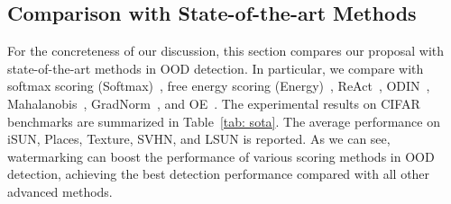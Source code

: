 \documentclass{article}
\begin{document}
\subsection{Comparison with State-of-the-art Methods}

For the concreteness of our discussion, this section compares our proposal with state-of-the-art methods in OOD detection. In particular, we compare with softmax scoring (Softmax)~\cite{hendrycks2016baseline}, free energy scoring (Energy)~\cite{liu2020energy}, ReAct~\cite{sun2021react}, ODIN~\cite{LiangLS18}, Mahalanobis~\cite{lee2018simple}, GradNorm~\cite{huang2021importance}, and OE~\cite{HendrycksMD19}. The experimental results on CIFAR benchmarks are summarized in Table~\ref{tab: sota}. The average performance on iSUN, Places, Texture, SVHN, and LSUN is reported. As we can see, watermarking can boost the performance of various scoring methods in OOD detection, achieving the best detection performance compared with all other advanced methods. 
\end{document}
